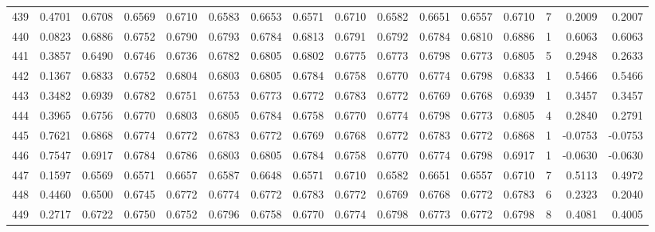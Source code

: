 \begin{tabular}{lrrrrrrrrrrrrrrr}
439 &      0.4701 &  0.6708 &  0.6569 &  0.6710 &  0.6583 &  0.6653 &  0.6571 &  0.6710 &  0.6582 &  0.6651 &   0.6557 &     0.6710 &      7 &                    0.2009 &                     0.2007 \\
440 &      0.0823 &  0.6886 &  0.6752 &  0.6790 &  0.6793 &  0.6784 &  0.6813 &  0.6791 &  0.6792 &  0.6784 &   0.6810 &     0.6886 &      1 &                    0.6063 &                     0.6063 \\
441 &      0.3857 &  0.6490 &  0.6746 &  0.6736 &  0.6782 &  0.6805 &  0.6802 &  0.6775 &  0.6773 &  0.6798 &   0.6773 &     0.6805 &      5 &                    0.2948 &                     0.2633 \\
442 &      0.1367 &  0.6833 &  0.6752 &  0.6804 &  0.6803 &  0.6805 &  0.6784 &  0.6758 &  0.6770 &  0.6774 &   0.6798 &     0.6833 &      1 &                    0.5466 &                     0.5466 \\
443 &      0.3482 &  0.6939 &  0.6782 &  0.6751 &  0.6753 &  0.6773 &  0.6772 &  0.6783 &  0.6772 &  0.6769 &   0.6768 &     0.6939 &      1 &                    0.3457 &                     0.3457 \\
444 &      0.3965 &  0.6756 &  0.6770 &  0.6803 &  0.6805 &  0.6784 &  0.6758 &  0.6770 &  0.6774 &  0.6798 &   0.6773 &     0.6805 &      4 &                    0.2840 &                     0.2791 \\
445 &      0.7621 &  0.6868 &  0.6774 &  0.6772 &  0.6783 &  0.6772 &  0.6769 &  0.6768 &  0.6772 &  0.6783 &   0.6772 &     0.6868 &      1 &                   -0.0753 &                    -0.0753 \\
446 &      0.7547 &  0.6917 &  0.6784 &  0.6786 &  0.6803 &  0.6805 &  0.6784 &  0.6758 &  0.6770 &  0.6774 &   0.6798 &     0.6917 &      1 &                   -0.0630 &                    -0.0630 \\
447 &      0.1597 &  0.6569 &  0.6571 &  0.6657 &  0.6587 &  0.6648 &  0.6571 &  0.6710 &  0.6582 &  0.6651 &   0.6557 &     0.6710 &      7 &                    0.5113 &                     0.4972 \\
448 &      0.4460 &  0.6500 &  0.6745 &  0.6772 &  0.6774 &  0.6772 &  0.6783 &  0.6772 &  0.6769 &  0.6768 &   0.6772 &     0.6783 &      6 &                    0.2323 &                     0.2040 \\
449 &      0.2717 &  0.6722 &  0.6750 &  0.6752 &  0.6796 &  0.6758 &  0.6770 &  0.6774 &  0.6798 &  0.6773 &   0.6772 &     0.6798 &      8 &                    0.4081 &                     0.4005 \\

\end{tabular}
